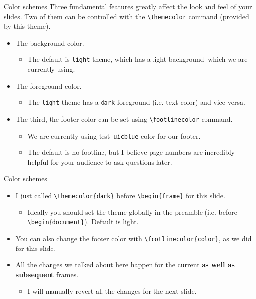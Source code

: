 \documentclass{beamer}
\newcommand{\testcolor}[1]{\colorbox{#1}{\textcolor{#1}{test}}~\texttt{#1}}
\begin{document}
\begin{frame}[fragile]{Color schemes}
Three fundamental features greatly affect the look and feel of your slides. Two of them can be controlled with the \verb|\themecolor| command (provided by this theme).
\begin{itemize}
\item The background color.
\begin{itemize}
    \item The default is \verb|light| theme, which has a light background, which we are currently using.
\end{itemize}
\item The foreground color.
\begin{itemize}
    \item The \verb|light| theme has a \verb|dark| foreground (i.e. text color) and vice versa.
\end{itemize}
\item The third, the footer color can be set using \verb|\footlinecolor| command.
\begin{itemize}
    \item We are currently using \testcolor{uicblue} color for our footer.
    \item The default is no footline, but I believe page numbers are incredibly helpful for your audience to ask questions later.
\end{itemize}
\end{itemize}
\end{frame}


\begin{frame}[fragile]{Color schemes}
\begin{itemize}
\item I just called \verb|\themecolor{dark}| before \verb|\begin{frame}| for this slide.
\begin{itemize}
    \item Ideally you should set the theme globally in the preamble (i.e. before \verb|\begin{document}|). Default is light.
\end{itemize}
\item You can also change the footer color with \verb|\footlinecolor{color}|, as we did for this slide.
\item All the changes we talked about here happen for the current \textbf{as well as subsequent} frames.
\begin{itemize}
    \item I will manually revert all the changes for the next slide.
\end{itemize}
\end{itemize}
\end{frame}
\end{document}
